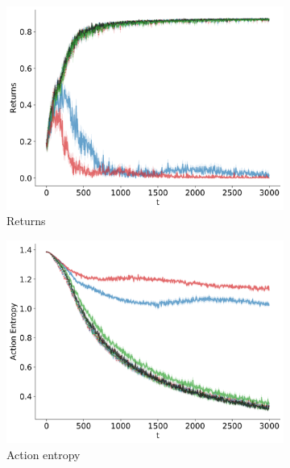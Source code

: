 \begin{figure}[!ht]
\centering
  \begin{subfigure}[b]{0.32\linewidth}
    \includegraphics[width=\textwidth]{articles/baselines/figs/baseline_4rooms/VPG_relative_perturb_Returns.png}
    \caption{Returns}
  \end{subfigure}
    \begin{subfigure}[b]{0.32\linewidth}
    \includegraphics[width=\textwidth]{articles/baselines/figs/baseline_4rooms/VPG_relative_perturb_Action_Entropy.png}
    \caption{Action entropy}
  \end{subfigure}
  \begin{subfigure}[b]{0.32\linewidth}

\end{subfigure}
\end{figure}
